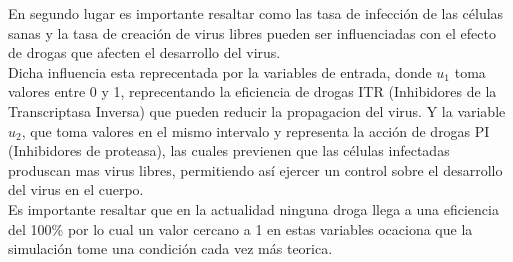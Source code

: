 \documentclass{article}
\begin{document}
En segundo lugar es importante resaltar como las tasa de infección de las
células sanas y la tasa de creación de virus libres pueden ser influenciadas
con el efecto de drogas que afecten el desarrollo del virus.\\

Dicha influencia esta reprecentada por la variables de entrada, donde $u_1$
toma valores entre 0 y 1, reprecentando la eficiencia de drogas ITR
(Inhibidores de la Transcriptasa Inversa) que pueden reducir la propagacion del
virus. Y la variable $u_2$, que toma valores en el mismo intervalo y representa
la acción de drogas PI (Inhibidores de proteasa), las cuales previenen que las
células infectadas produscan mas virus libres, permitiendo así ejercer un
control sobre el desarrollo del virus en el cuerpo.\\

Es importante resaltar que  en la actualidad ninguna droga llega a una
eficiencia del 100\% por lo cual un valor cercano a 1 en estas variables
ocaciona que la simulación tome una condición cada vez más teorica.\\



\end{document}

